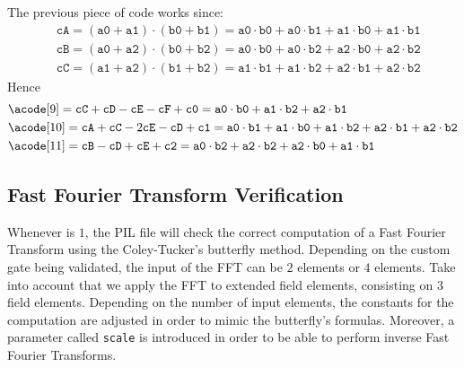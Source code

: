The previous piece of code works since:
\begin{align*}
&\texttt{cA} = (\texttt{a0} + \texttt{a1}) \cdot (\texttt{b0} + \texttt{b1}) = \texttt{a0} \cdot \texttt{b0} + \texttt{a0} \cdot \texttt{b1} + \texttt{a1} \cdot \texttt{b0} + \texttt{a1} \cdot \texttt{b1} \\
&\texttt{cB} = (\texttt{a0} + \texttt{a2}) \cdot (\texttt{b0} + \texttt{b2}) = \texttt{a0} \cdot \texttt{b0} + \texttt{a0} \cdot \texttt{b2} + \texttt{a2} \cdot \texttt{b0} + \texttt{a2} \cdot \texttt{b2} \\
&\texttt{cC} = (\texttt{a1} + \texttt{a2}) \cdot (\texttt{b1} + \texttt{b2}) = \texttt{a1} \cdot \texttt{b1} + \texttt{a1} \cdot \texttt{b2} + \texttt{a2} \cdot \texttt{b1} + \texttt{a2} \cdot \texttt{b2}
\end{align*}
Hence
\begin{align*}
&\acode[9] = \texttt{cC} + \texttt{cD} - \texttt{cE} - \texttt{cF} + \texttt{c0} = \texttt{a0} \cdot \texttt{b0} + \texttt{a1} \cdot \texttt{b2} + \texttt{a2} \cdot \texttt{b1} \\
&\acode[10] = \texttt{cA} + \texttt{cC} - 2 \texttt{cE} - \texttt{cD} + \texttt{c1} = \texttt{a0} \cdot \texttt{b1} + \texttt{a1} \cdot \texttt{b0} + \texttt{a1} \cdot \texttt{b2} + \texttt{a2} \cdot \texttt{b1} + \texttt{a2} \cdot \texttt{b2} \\
&\acode[11] = \texttt{cB} - \texttt{cD} + \texttt{cE} + \texttt{c2} = \texttt{a0} \cdot \texttt{b2} + \texttt{a2} \cdot \texttt{b2} + \texttt{a2} \cdot \texttt{b0} + \texttt{a1} \cdot \texttt{b1}
\end{align*}







\subsection{Fast Fourier Transform Verification}

Whenever \FFT is $1$, the PIL file will check the correct computation of a Fast Fourier Transform using the Coley-Tucker's butterfly method. Depending on the custom gate being validated, the input of the FFT can be $2$ elements or $4$ elements. Take into account that we apply the FFT to extended field elements, consisting on $3$ field elements. Depending on the number of input elements, the constants for the computation \CONST are adjusted in order to mimic the butterfly's formulas. Moreover, a parameter called \texttt{scale} is introduced in order to be able to perform inverse Fast Fourier Transforms. 

